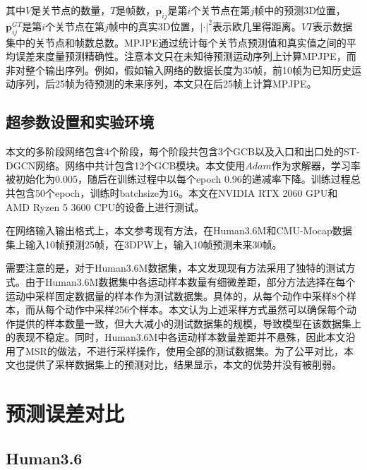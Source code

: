 其中$V$是关节点的数量，$T$是帧数，$\mathbf{p}_{ij}$是第$i$个关节点在第$j$帧中的预测3D位置，$\mathbf{p}^{GT}_{ij}$是第$i$个关节点在第$j$帧中的真实3D位置，$|\cdot|^2$表示欧几里得距离。$VT$表示数据集中的关节点和帧数总数。MPJPE通过统计每个关节点预测值和真实值之间的平均误差来度量预测精确性。注意本文只在未知待预测运动序列上计算MPJPE，而非对整个输出序列。例如，假如输入网络的数据长度为35帧，前10帧为已知历史运动序列，后25帧为待预测的未来序列，本文只在后25帧上计算MPJPE。

\subsection{超参数设置和实验环境}
本文的多阶段网络包含4个阶段，每个阶段共包含3个GCB以及入口和出口处的ST-DGCN网络。网络中共计包含12个GCB模块。本文使用$Adam$作为求解器，学习率被初始化为0.005，随后在训练过程中以每个epoch 0.96的递减率下降。训练过程总共包含50个epoch，训练时batchsize为16。本文在NVIDIA RTX 2060 GPU和AMD Ryzen 5 3600 CPU的设备上进行测试。

在网络输入输出格式上，本文参考现有方法，在Human3.6M和CMU-Mocap数据集上输入10帧预测25帧，在3DPW上，输入10帧预测未来30帧。

需要注意的是，对于Human3.6M数据集，本文发现现有方法采用了独特的测试方式。由于Human3.6M数据集中各运动样本数量有细微差距，部分方法选择在每个运动中采样固定数据量的样本作为测试数据集。具体的，\parencite{li2020dynamic, mao2019learning, martinez2017human}从每个动作中采样8个样本，而\parencite{mao2020history}从每个动作中采样256个样本。本文认为上述采样方式虽然可以确保每个动作提供的样本数量一致，但大大减小的测试数据集的规模，导致模型在该数据集上的表现不稳定。同时，Human3.6M中各运动样本数量差距并不悬殊，因此本文沿用了MSR\parencite{dang2021msr}的做法，不进行采样操作，使用全部的测试数据集。为了公平对比，本文也提供了采样数据集上的预测对比，结果显示，本文的优势并没有被削弱。



\section{预测误差对比}\label{section:prediction_error}
\subsection{Human3.6}

